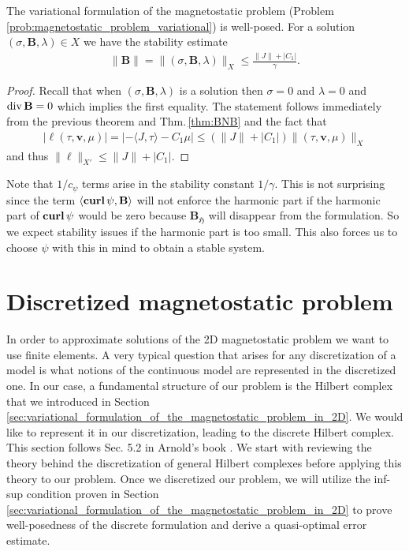 \documentclass[../master_thesis.tex]{subfiles}
\begin{document}
\begin{corollary}
    The variational formulation of the magnetostatic problem 
    {\normalfont (Problem\,\ref{prob:magnetostatic_problem_variational})} is well-posed. 
    For a solution $(\sigma, \mathbf{B},\lambda) \in X$
    we have the stability estimate 
    \begin{align*}
        \lVert \mathbf{B} \rVert  = \lVert (\sigma, \mathbf{B}, \lambda )\rVert _X 
        \leq \frac{\lVert J \rVert + |C_1|}{\gamma}.
    \end{align*}
\end{corollary}
\begin{proof}
    Recall that when $(\sigma, \mathbf{B},\lambda)$ is a solution 
    then $\sigma = 0$ and $\lambda = 0$ and $\operatorname{div} \mathbf{B}=0$ which implies the 
    first equality.
    The statement follows immediately from the previous theorem and 
    Thm.\,\ref{thm:BNB} and the fact that 
    \begin{align*}
        | \ell(\tau,\mathbf{v},\mu) |
        = | - \langle J, \tau \rangle - C_1 \mu | 
        \leq (\lVert J \rVert + | C_1 |) \lVert (\tau,\mathbf{v},\mu) \rVert _X
    \end{align*}
    and thus $\lVert \ell \rVert _{X'} \leq \lVert J \rVert + | C_1 |$.
\end{proof}

\begin{remark}
    Note that $1/c_\psi$ terms arise
    in the stability constant $1/\gamma$. This is not surprising since the term 
    $\langle \veccurl \psi, \mathbf{B} \rangle$ will not enforce the harmonic 
    part if the harmonic part of $\veccurl \psi$ would be zero because 
    $\mathbf{B}_\mathfrak{H}$ will disappear from the formulation. So we 
    expect stability issues if the harmonic part is too small.
    This also forces us to choose $\psi$ with this in mind to obtain a 
    stable system.
\end{remark}

\section{Discretized magnetostatic problem}

In order to approximate solutions of the  2D magnetostatic problem we want to use finite elements.
A very typical question that arises for any discretization of a model is what 
notions of the continuous model are represented in the discretized one. 
In our case, a fundamental structure of our problem is the Hilbert complex that we introduced in Section\,
\ref{sec:variational_formulation_of_the_magnetostatic_problem_in_2D}.
We would like to represent it in our discretization, leading to the discrete Hilbert complex. 
This section follows Sec. 5.2 in Arnold's book \cite{arnold}. We start with reviewing the 
 theory behind the discretization of general Hilbert complexes before applying this 
theory to our problem. Once we discretized our problem, we will utilize
the inf-sup condition proven in Section\,\ref{sec:variational_formulation_of_the_magnetostatic_problem_in_2D} 
to prove well-posedness of 
the discrete formulation and derive a quasi-optimal error estimate.
\end{document}
